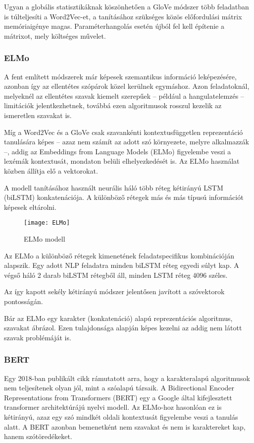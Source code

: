 Ugyan a globális statisztikáknak köszönhetően a GloVe módszer több feladatban is túlteljesíti a Word2Vec-et, a tanításához szükséges közös előfordulási mátrix memóriaigénye magas. Paraméterhangolás esetén újból fel kell építenie a mátrixot, mely költséges művelet.

\subsubsection{ELMo}
A fent említett módszerek már képesek szemantikus információ leképezésére, azonban így az ellentétes szópárok közel kerülnek egymáshoz. Azon feladatoknál, melyeknél az ellentétes szavak kiemelt szerepűek – például a hangulatelemzés – limitációk jelentkezhetnek, továbbá ezen algoritmusok rosszul kezelik az ismeretlen szavakat is.

Míg a Word2Vec és a GloVe csak szavankénti kontextusfüggetlen reprezentáció tanulására képes – azaz nem számít az adott szó környezete, melyre alkalmazzák –, addig az Embeddings from Language Models (ELMo) figyelembe veszi a lexémák kontextusát, mondaton belüli elhelyezkedését is. Az ELMo használat közben állítja elő a vektorokat.

A modell tanításához használt neurális háló több réteg kétirányú LSTM (biLSTM) konkatenációja. A különböző rétegek más és más típusú információt képesek eltárolni.

\begin{figure}[H]
	\centering
	\texttt{[image: ELMo]}
	\caption{ELMo modell}
\end{figure}

Az ELMo a különböző rétegek kimenetének feladatspecifikus kombinációján alapszik. Egy adott NLP feladatra minden biLSTM réteg egyedi súlyt kap. A végső háló 2 darab biLSTM rétegből áll, minden LSTM réteg 4096 széles.

Az így kapott sekély kétirányú módszer jelentősen javított a szóvektorok pontosságán.

Bár az ELMo egy karakter (konkatenáció) alapú reprezentációs algoritmus, szavakat ábrázol. Ezen tulajdonsága alapján képes kezelni az addig nem látott szavak problémáját is.


\subsubsection{BERT}
Egy 2018-ban publikált cikk rámutatott arra, hogy a karakteralapú algoritmusok nem teljesítenek olyan jól, mint a szóalapú társaik. A Bidirectional Encoder Representations from Transformers (BERT) egy a Google által kifejlesztett transformer architektúrájú nyelvi modell. Az ELMo-hoz hasonlóan ez is kétirányú, azaz egy szó mindkét oldali kontextusát figyelembe veszi a tanulás alatt. A BERT azonban bemenetként nem szavakat és nem is karaktereket kap, hanem szótöredékeket.

